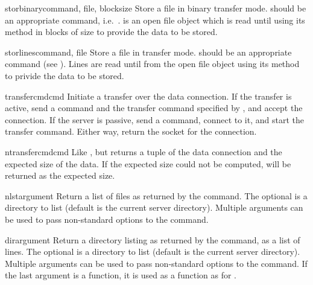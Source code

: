 \begin{methoddesc}{storbinary}{command, file, blocksize}
Store a file in binary transfer mode.   should be an
appropriate  command, i.e.\ .
 is an open file object which is read until \EOF{} using its
 method in blocks of size  to provide the
data to be stored.
\end{methoddesc}

\begin{methoddesc}{storlines}{command, file}
Store a file in \ASCII{} transfer mode.   should be an
appropriate  command (see ).  Lines are
read until \EOF{} from the open file object  using its
 method to privide the data to be stored.
\end{methoddesc}

\begin{methoddesc}{transfercmd}{cmd}
Initiate a transfer over the data connection.  If the transfer is
active, send a  command and the transfer command specified
by , and accept the connection.  If the server is passive,
send a  command, connect to it, and start the transfer
command.  Either way, return the socket for the connection.
\end{methoddesc}

\begin{methoddesc}{ntransfercmd}{cmd}
Like , but returns a tuple of the data
connection and the expected size of the data.  If the expected size
could not be computed,  will be returned as the expected
size.
\end{methoddesc}

\begin{methoddesc}{nlst}{argument\optional{, \ldots}}
Return a list of files as returned by the  command.  The
optional  is a directory to list (default is the current
server directory).  Multiple arguments can be used to pass
non-standard options to the  command.
\end{methoddesc}

\begin{methoddesc}{dir}{argument\optional{, \ldots}}
Return a directory listing as returned by the  command, as
a list of lines.  The optional  is a directory to list
(default is the current server directory).  Multiple arguments can be
used to pass non-standard options to the  command.  If the
last argument is a function, it is used as a  function
as for .
\end{methoddesc}

